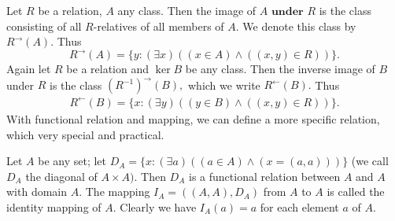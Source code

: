     Let $R$ be a relation, $A$ any class. Then the image of $A\textbf{ under }R$ is the class consisting of all $R$-relatives of all members of $A.$ We denote this class by $R^{\to}(A).$ Thus
    $$
    R^{\to}(A)=\{y:(\exists x)((x\in A)\land((x,y)\in R))\}.
    $$
    Again let $R$ be a relation and $\ker B$ be any class. Then the inverse image of $B$ under $R$ is the class $( R^{- 1}) ^{\to }( B) , $ which we write $R^{\leftarrow}( B) .$ Thus
    $$
    \begin{aligned}R^{\leftarrow}(B)=\{x:(\exists y)((y\in B)\land((x,y)\in R))\}.\end{aligned}
    $$
    With functional relation and mapping, we can define a more specific relation, which very special and practical.
    \begin{definition}\label{diagonalR}
    	Let $A$ be any set; let $D_A=\{x:(\exists a)((a\in A)\land(x=(a,a)))\}$ (we call $D_A$ the diagonal of $A\times A).$ Then $D_A$ is a functional relation between $A$ and $A$ with domain $A.$ The mapping $I_A=((A,A),D_A)$ from $A$ to $A$ is called the identity mapping of $A.$ Clearly we have $I_{A}(a)=a$ for each element $a$ of $A.$
    \end{definition}
